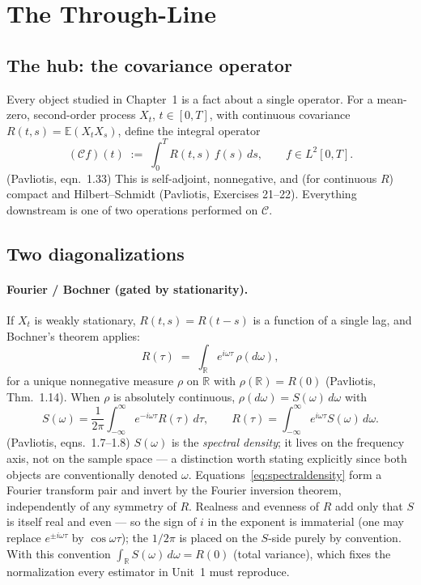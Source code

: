 \documentclass[11pt]{article}
\newcommand{\pav}[1]{{\small\color{hubblue}(Pavliotis, #1)}}
\begin{document}
\tableofcontents

\section{The Through-Line}

\subsection{The hub: the covariance operator}

Every object studied in Chapter~1 is a fact about a single operator. For a mean-zero, second-order
process $X_t$, $t\in[0,T]$, with continuous covariance $R(t,s) = \mathbb{E}(X_tX_s)$, define the
integral operator
\begin{equation}
(\mathcal{C}f)(t) \;:=\; \int_0^T R(t,s)\,f(s)\,ds, \qquad f \in L^2[0,T].
\label{eq:covop}
\end{equation}
\pav{eqn.~1.33} This is self-adjoint, nonnegative, and (for continuous $R$) compact and
Hilbert--Schmidt \pav{Exercises 21--22}. Everything downstream is one of two operations performed on
$\mathcal{C}$.

\subsection{Two diagonalizations}

\paragraph{Fourier / Bochner (gated by stationarity).}
If $X_t$ is weakly stationary, $R(t,s) = R(t-s)$ is a function of a single lag, and Bochner's theorem
applies:
\begin{equation}
R(\tau) \;=\; \int_{\mathbb{R}} e^{i\omega\tau}\,\rho(d\omega),
\label{eq:bochner}
\end{equation}
for a unique nonnegative measure $\rho$ on $\mathbb{R}$ with $\rho(\mathbb{R}) = R(0)$
\pav{Thm.~1.14}. When $\rho$ is absolutely continuous, $\rho(d\omega) = S(\omega)\,d\omega$ with
\begin{equation}
S(\omega) = \frac{1}{2\pi}\int_{-\infty}^{\infty} e^{-i\omega\tau}R(\tau)\,d\tau,
\qquad
R(\tau) = \int_{-\infty}^{\infty} e^{i\omega\tau}S(\omega)\,d\omega.
\label{eq:spectraldensity}
\end{equation}
\pav{eqns.~1.7--1.8} $S(\omega)$ is the \emph{spectral density}; it lives on the frequency axis, not
on the sample space --- a distinction worth stating explicitly since both objects are conventionally
denoted $\omega$. Equations~\eqref{eq:spectraldensity} form a Fourier transform pair and invert by
the Fourier inversion theorem, independently of any symmetry of $R$. Realness and evenness of $R$ add
only that $S$ is itself real and even --- so the sign of $i$ in the exponent is immaterial (one may
replace $e^{\pm i\omega\tau}$ by $\cos\omega\tau$); the $1/2\pi$ is placed on the $S$-side purely by
convention. With this convention $\int_{\mathbb{R}} S(\omega)\,d\omega = R(0)$ (total variance),
which fixes the normalization every estimator in Unit~1 must reproduce.
\end{document}
